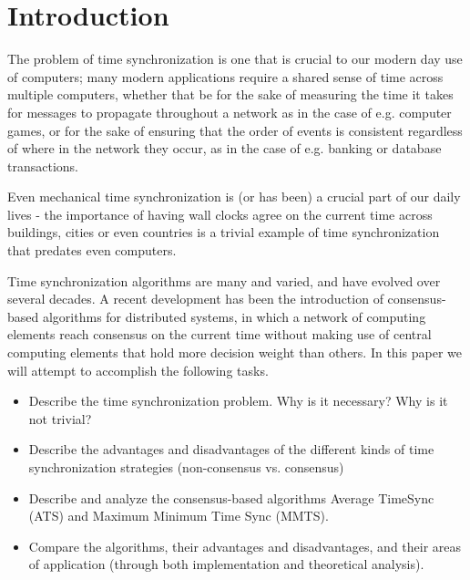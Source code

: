 \documentclass[a4paper,12pt]{article}
\renewcommand{\baselinestretch}{1.44}
\begin{document}
\renewcommand{\baselinestretch}{0.9}

\tableofcontents
\clearpage

\setcounter{page}{1}

\renewcommand{\baselinestretch}{1.42}


\section{Introduction}

The problem of time synchronization is one that is crucial to our modern day use of computers; many modern applications require a shared sense of time across multiple computers, whether that be for the sake of measuring the time it takes for messages to propagate throughout a network as in the case of e.g. computer games, or for the sake of ensuring that the order of events is consistent regardless of where in the network they occur, as in the case of e.g. banking or database transactions.

Even mechanical time synchronization is (or has been) a crucial part of our daily lives - the importance of having wall clocks agree on the current time across buildings, cities or even countries is a trivial example of time synchronization that predates even computers.

Time synchronization algorithms are many and varied, and have evolved over several decades. A recent development has been the introduction of consensus-based algorithms for distributed systems, in which a network of computing elements reach consensus on the current time without making use of central computing elements that hold more decision weight than others. In this paper we will attempt to accomplish the following tasks.

\begin{itemize}
    \item Describe the time synchronization problem. Why is it necessary? Why is it not trivial? 
    \item Describe the advantages and disadvantages of the different kinds of time synchronization strategies (non-consensus vs. consensus)
    \item Describe and analyze the consensus-based algorithms Average TimeSync (ATS) and Maximum Minimum Time Sync (MMTS).
    \item Compare the algorithms, their advantages and disadvantages, and their areas of application (through both implementation and theoretical analysis).
\end{itemize}
\end{document}
